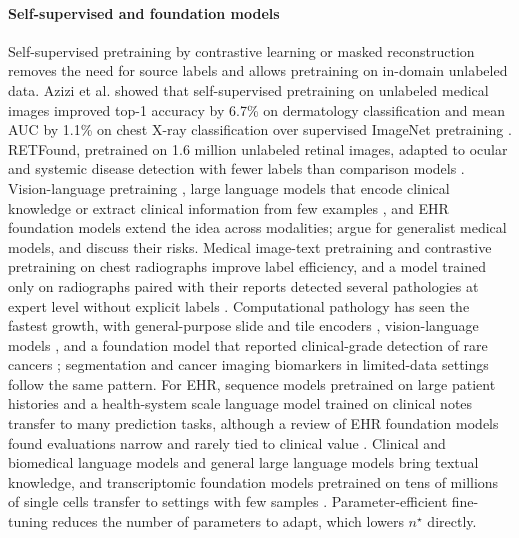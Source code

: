 \documentclass[acmsmall,screen,review]{acmart}
\theoremstyle{acmdefinition}
\begin{document}
\paragraph{Self-supervised and foundation models} Self-supervised pretraining by contrastive learning \cite{chen2020simple} or masked reconstruction \cite{he2022masked} removes the need for source labels and allows pretraining on in-domain unlabeled data. Azizi et al. showed that self-supervised pretraining on unlabeled medical images improved top-1 accuracy by 6.7\% on dermatology classification and mean AUC by 1.1\% on chest X-ray classification over supervised ImageNet pretraining \cite{azizi2021big}. RETFound, pretrained on 1.6 million unlabeled retinal images, adapted to ocular and systemic disease detection with fewer labels than comparison models \cite{zhou2023foundation}. Vision-language pretraining \cite{radford2021learning,wang2022medclip}, large language models that encode clinical knowledge \cite{singhal2023large} or extract clinical information from few examples \cite{agrawal2022large}, and EHR foundation models \cite{rasmy2021med,steinberg2021language} extend the idea across modalities; \citet{moor2023foundation} argue for generalist medical models, and \citet{bommasani2021opportunities} discuss their risks. Medical image-text pretraining \cite{huang2021gloria,zhang2022contrastive} and contrastive pretraining on chest radiographs \cite{sowrirajan2021moco} improve label efficiency, and a model trained only on radiographs paired with their reports detected several pathologies at expert level without explicit labels \cite{tiu2022expert}. Computational pathology has seen the fastest growth, with general-purpose slide and tile encoders \cite{chen2024general,xu2024whole}, vision-language models \cite{lu2024visual}, and a foundation model that reported clinical-grade detection of rare cancers \cite{vorontsov2024foundation}; segmentation \cite{ma2024segment} and cancer imaging biomarkers in limited-data settings \cite{pai2024foundation} follow the same pattern. For EHR, sequence models pretrained on large patient histories \cite{choi2016doctor,li2020behrt} and a health-system scale language model trained on clinical notes \cite{jiang2023health} transfer to many prediction tasks, although a review of EHR foundation models found evaluations narrow and rarely tied to clinical value \cite{wornow2023shaky}. Clinical and biomedical language models \cite{alsentzer2019publicly,lee2020biobert} and general large language models \cite{nori2023capabilities} bring textual knowledge, and transcriptomic foundation models pretrained on tens of millions of single cells transfer to settings with few samples \cite{cui2024scgpt,theodoris2023transfer}. Parameter-efficient fine-tuning \cite{hu2022lora} reduces the number of parameters to adapt, which lowers $n^{\star}$ directly.
\end{document}
